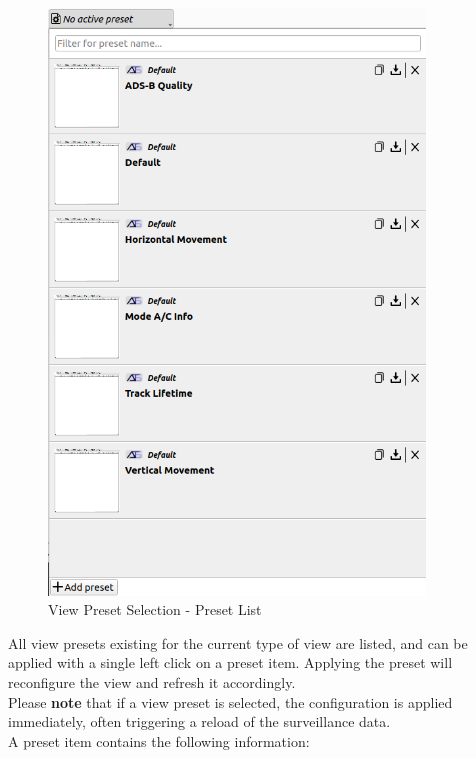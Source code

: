 \begin{figure}[H]
    \center
    \includegraphics[width=10cm,frame]{figures/view_presets.png}
  \caption{View Preset Selection - Preset List}
\end{figure}

All view presets existing for the current type of view are listed, and can be applied with a single left click on a preset item. 
Applying the preset will reconfigure the view and refresh it accordingly. \\

Please \textbf{note} that if a view preset is selected, the configuration is applied immediately, often triggering a reload of the surveillance data. \\

A preset item contains the following information:


